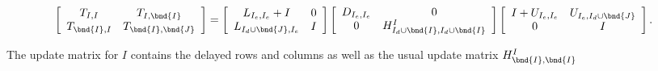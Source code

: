 \begin{equation}
\label{alg:eqn:mf-delayed}
\left \lbrack \begin{array}{cc}
T_{I,I} & T_{I, \bnd{I}} \\
T_{\bnd{I},I} & T_{\bnd{I},\bnd{J}}
\end{array} \right \rbrack
=
\left \lbrack \begin{array}{cc}
L_{I_e,I_e} + I & 0 \\
L_{I_d \cup \bnd{J},I_e}  & I
\end{array} \right \rbrack
\left \lbrack \begin{array}{cc}
D_{I_e,I_e} & 0 \\
0           & H_{I_d \cup \bnd{I},I_d \cup \bnd{I}}^I
\end{array} \right \rbrack
\left \lbrack \begin{array}{cc}
I + U_{I_e,I_e} & U_{I_e,I_d \cup \bnd{J}} \\
0 & I \\
\end{array} \right \rbrack.
\end{equation}
\par
The update matrix for $I$ contains the delayed rows and columns
as well as the usual update matrix $H^I_{\bnd{I},\bnd{I}}$
